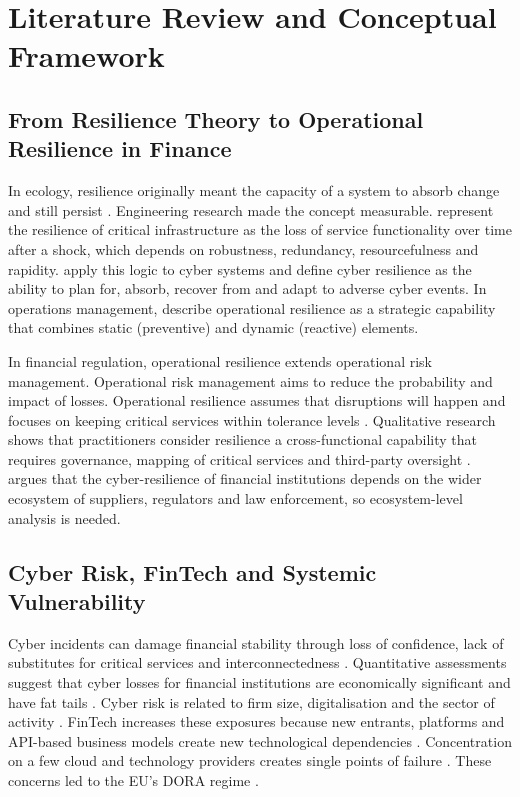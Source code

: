 \documentclass[11pt,a4paper]{article}
\begin{document}
\section{Literature Review and Conceptual Framework}\label{sec:background}

\subsection{From Resilience Theory to Operational Resilience in Finance}

In ecology, resilience originally meant the capacity of a system to absorb change and still persist \citep{Holling1973}. Engineering research made the concept measurable. \citet{Bruneau2003} represent the resilience of critical infrastructure as the loss of service functionality over time after a shock, which depends on robustness, redundancy, resourcefulness and rapidity. \citet{Linkov2018} apply this logic to cyber systems and define cyber resilience as the ability to plan for, absorb, recover from and adapt to adverse cyber events. In operations management, \citet{Annarelli2016} describe operational resilience as a strategic capability that combines static (preventive) and dynamic (reactive) elements.

In financial regulation, operational resilience extends operational risk management. Operational risk management aims to reduce the probability and impact of losses. Operational resilience assumes that disruptions will happen and focuses on keeping critical services within tolerance levels \citep{BCBS2021,Milkau2021}. Qualitative research shows that practitioners consider resilience a cross-functional capability that requires governance, mapping of critical services and third-party oversight \citep{Iyer2024}. \citet{Dupont2019} argues that the cyber-resilience of financial institutions depends on the wider ecosystem of suppliers, regulators and law enforcement, so ecosystem-level analysis is needed.

\subsection{Cyber Risk, FinTech and Systemic Vulnerability}

Cyber incidents can damage financial stability through loss of confidence, lack of substitutes for critical services and interconnectedness \citep{Kopp2017}. Quantitative assessments suggest that cyber losses for financial institutions are economically significant and have fat tails \citep{Bouveret2018,Bouveret2019}. Cyber risk is related to firm size, digitalisation and the sector of activity \citep{Aldasoro2022}. FinTech increases these exposures because new entrants, platforms and API-based business models create new technological dependencies \citep{Gomber2018,Chen2022,Vucinic2022}. Concentration on a few cloud and technology providers creates single points of failure \citep{Gulliver2023,FSB2023}. These concerns led to the EU's DORA regime \citep{EU2022DORA}.
\end{document}
